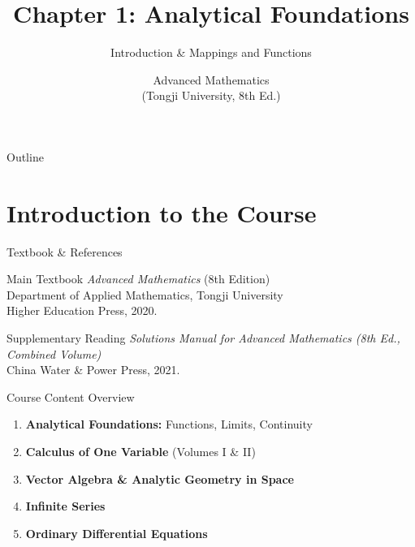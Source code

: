 \documentclass[aspectratio=169,10pt]{beamer}
\title{Chapter 1: Analytical Foundations}
\subtitle{Introduction \& Mappings and Functions}
\author{Advanced Mathematics \\ (Tongji University, 8th Ed.)}
\date{}
\institute{}
\begin{document}
\begin{frame}
  \titlepage
\end{frame}

\begin{frame}{Outline}
  \tableofcontents
\end{frame}

\section{Introduction to the Course}

\begin{frame}{Textbook \& References}
  \begin{block}{Main Textbook}
    \textit{Advanced Mathematics} (8th Edition)\\
    Department of Applied Mathematics, Tongji University\\
    Higher Education Press, 2020.
  \end{block}
  \pause
  \begin{block}{Supplementary Reading}
    \textit{Solutions Manual for Advanced Mathematics (8th Ed., Combined Volume)}\\
    China Water \& Power Press, 2021.
  \end{block}
\end{frame}

\begin{frame}{Course Content Overview}
  \begin{enumerate}
    \item<1-> \textbf{Analytical Foundations:} Functions, Limits, Continuity
    \item<2-> \textbf{Calculus of One Variable} (Volumes I \& II)
    \item<3-> \textbf{Vector Algebra \& Analytic Geometry in Space}
    \item<4-> \textbf{Infinite Series}
    \item<5-> \textbf{Ordinary Differential Equations}
  \end{enumerate}
  \vfill
\end{frame}
\end{document}
